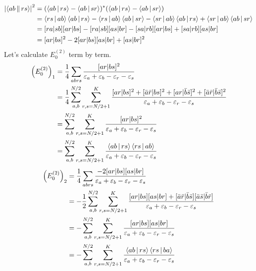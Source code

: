 \documentclass[a4paper]{article}
\begin{document}
\begin{equation}\label{key}
\begin{aligned}
\abs{\Braket{ab||rs}}^2 &= (\Braket{ab|rs} - \Braket{ab|sr})^*(\Braket{ab|rs} - \Braket{ab|sr})\\
&= \Braket{rs|ab}\Braket{ab|rs} - \Braket{rs|ab}\Braket{ab|sr} - \Braket{sr|ab}\Braket{ab|rs} + \Braket{sr|ab}\Braket{ab|sr}\\
&= [ra|sb][ar|bs] - [ra|sb][as|br] - [sa|rb][ar|bs] + [sa|rb][as|br]\\
&= [ar|bs]^2 - 2[ar|bs][as|br] + [as|br]^2
\end{aligned}
\end{equation}
Let's calculate $ E_0^{(2)} $ term by term.
\begin{equation}\label{key}
\begin{aligned}
\qty(E_0^{(2)})_1 &= \dfrac{1}{4}\sum_{abrs} \dfrac{[ar|bs]^2}{\varepsilon_a+\varepsilon_b-\varepsilon_r-\varepsilon_s}\\
&= \dfrac{1}{4}\sum_{a,b}^{N/2}\sum_{r,s=N/2+1}^K \dfrac{[ar|bs]^2 +[\bar{a}\bar{r}|bs]^2 + [ar|\bar{b}\bar{s}]^2 +[\bar{a}\bar{r}|\bar{b}\bar{s}]^2}{\varepsilon_a+\varepsilon_b-\varepsilon_r-\varepsilon_s}\\
&= \sum_{a,b}^{N/2}\sum_{r,s=N/2+1}^K \dfrac{[ar|bs]^2}{\varepsilon_a+\varepsilon_b-\varepsilon_r-\varepsilon_s}\\
&= \sum_{a,b}^{N/2}\sum_{r,s=N/2+1}^K \dfrac{\Braket{ab|rs}\Braket{rs|ab}}{\varepsilon_a+\varepsilon_b-\varepsilon_r-\varepsilon_s}
\end{aligned}
\end{equation}
\begin{equation}\label{key}
\begin{aligned}
\qty(E_0^{(2)})_2 &= \dfrac{1}{4}\sum_{abrs} \dfrac{-2[ar|bs][as|br]}{\varepsilon_a+\varepsilon_b-\varepsilon_r-\varepsilon_s}\\
&= -\dfrac{1}{2}\sum_{a,b}^{N/2}\sum_{r,s=N/2+1}^K \dfrac{[ar|bs][as|br] +[\bar{a}\bar{r}|\bar{b}\bar{s}][\bar{a}\bar{s}|\bar{b}\bar{r}]}{\varepsilon_a+\varepsilon_b-\varepsilon_r-\varepsilon_s}\\
&= -\sum_{a,b}^{N/2}\sum_{r,s=N/2+1}^K \dfrac{[ar|bs][as|br]}{\varepsilon_a+\varepsilon_b-\varepsilon_r-\varepsilon_s}\\
&= -\sum_{a,b}^{N/2}\sum_{r,s=N/2+1}^K \dfrac{\Braket{ab|rs}\Braket{rs|ba}}{\varepsilon_a+\varepsilon_b-\varepsilon_r-\varepsilon_s}
\end{aligned}
\end{equation}
\end{document}

